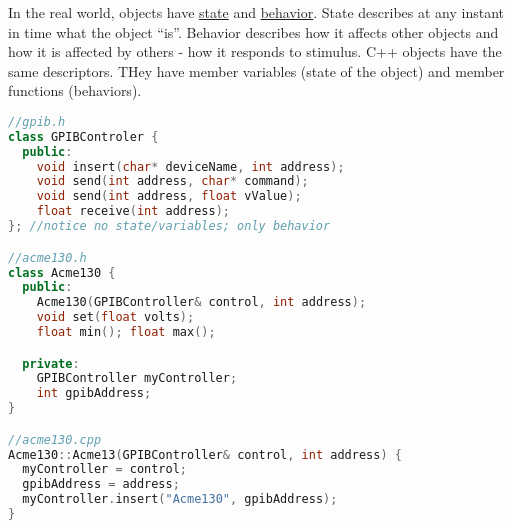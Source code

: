 

In the real world, objects have \underline{state} and \underline{behavior}. State describes at any instant in time what the object ``is''. Behavior describes how it affects other objects and how it is affected by others - how it responds to stimulus. C++ objects have the same descriptors. THey have member variables (state of the object) and member functions (behaviors).

\begin{lstlisting}[language=C++]
//gpib.h
class GPIBControler {
  public:
    void insert(char* deviceName, int address);
    void send(int address, char* command);
    void send(int address, float vValue);
    float receive(int address);
}; //notice no state/variables; only behavior

//acme130.h
class Acme130 {
  public:
    Acme130(GPIBController& control, int address);
    void set(float volts);
    float min(); float max();

  private:
    GPIBController myController;
    int gpibAddress;
}

//acme130.cpp
Acme130::Acme13(GPIBController& control, int address) {
  myController = control;
  gpibAddress = address;
  myController.insert("Acme130", gpibAddress);
}
\end{lstlisting}

